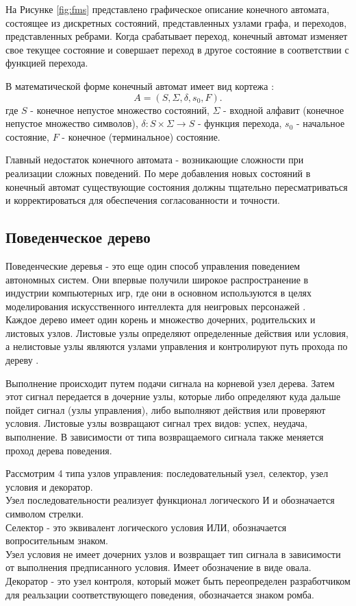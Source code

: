 На Рисунке \ref*{fig:fms} представлено графическое описание конечного автомата, состоящее из дискретных состояний, представленных узлами графа, и переходов, представленных ребрами. Когда срабатывает переход, конечный автомат изменяет свое текущее состояние и совершает переход в другое состояние в соответствии с функцией перехода.

В математической форме конечный автомат имеет вид кортежа \cite{wagner2006modeling}:
\begin{equation}
    \label{eq:e6}
    A = (S, \Sigma, \delta, s_0, F).
\end{equation}
где $S$ - конечное непустое множество состояний, $\Sigma$ - входной алфавит (конечное непустое множество символов), $\delta : S \times \Sigma \rightarrow S$ - функция перехода, $s_0$ - начальное состояние, $F$ - конечное (терминальное) состояние.

Главный недостаток конечного автомата - возникающие сложности при реализации сложных поведений. По мере добавления новых состояний в конечный автомат существующие состояния должны тщательно пересматриваться и корректироваться для обеспечения согласованности и точности.

\subsection{Поведенческое дерево}
Поведенческие деревья - это еще один способ управления поведением автономных систем. Они впервые получили широкое распространение в индустрии компьютерных игр, где они в основном используются в целях моделирования искусственного интеллекта для неигровых персонажей \cite{florez2009query}. \\
Каждое дерево имеет один корень и множество дочерних, родительских и листовых узлов. Листовые узлы определяют определенные действия или условия, а нелистовые узлы являются узлами управления и контролируют путь прохода по дереву \cite{colledanchise2018behavior}.

Выполнение происходит путем подачи сигнала на корневой узел дерева. Затем этот сигнал передается в дочерние узлы, которые либо определяют куда дальше пойдет сигнал (узлы управления), либо выполняют действия или проверяют условия. Листовые узлы возвращают сигнал трех видов: успех, неудача, выполнение. В зависимости от типа возвращаемого сигнала также меняется проход дерева поведения.

Рассмотрим 4 типа узлов управления: последовательный узел, селектор, узел условия и декоратор. \\
Узел последовательности реализует функционал логического И и обозначается символом стрелки. \\
Селектор - это эквивалент логического условия ИЛИ, обозначается вопросительным знаком. \\
Узел условия не имеет дочерних узлов и возвращает тип сигнала в зависимости от выполнения предписанного условия. Имеет обозначение в виде овала. \\ 
Декоратор - это узел контроля, который может быть переопределен разработчиком для реальзации соответствующего поведения, обозначается знаком ромба. \\

